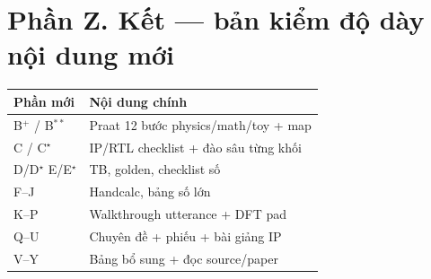 \section*{Phần Z. Kết --- bản kiểm độ dày nội dung mới}
\begin{center}
\small
\begin{tabular}{@{}lp{8cm}@{}}
\toprule
Phần mới & Nội dung chính \\
\midrule
B$^+$ / B$^{**}$ & Praat 12 bước physics/math/toy + map \\
C / C$^\star$ & IP/RTL checklist + đào sâu từng khối \\
D/D$^\star$ E/E$^\star$ & TB, golden, checklist số \\
F--J & Handcalc, bảng số lớn \\
K--P & Walkthrough utterance + DFT pad \\
Q--U & Chuyên đề + phiếu + bài giảng IP \\
V--Y & Bảng bổ sung + đọc source/paper \\
\bottomrule
\end{tabular}
\end{center}
